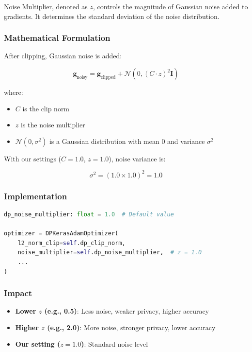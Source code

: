 \documentclass[12pt,a4paper]{article}
\begin{document}
Noise Multiplier, denoted as $z$, controls the magnitude of Gaussian noise added to gradients. It determines the standard deviation of the noise distribution.

\subsubsection{Mathematical Formulation}

After clipping, Gaussian noise is added:

\begin{equation}
\mathbf{g}_{\text{noisy}} = \mathbf{g}_{\text{clipped}} + \mathcal{N}(0, (C \cdot z)^2 \mathbf{I})
\end{equation}

where:
\begin{itemize}
    \item $C$ is the clip norm
    \item $z$ is the noise multiplier
    \item $\mathcal{N}(0, \sigma^2)$ is a Gaussian distribution with mean 0 and variance $\sigma^2$
\end{itemize}

With our settings ($C = 1.0$, $z = 1.0$), noise variance is:

\begin{equation}
\sigma^2 = (1.0 \times 1.0)^2 = 1.0
\end{equation}

\subsubsection{Implementation}

\begin{lstlisting}[language=Python, basicstyle=\small]
dp_noise_multiplier: float = 1.0  # Default value

optimizer = DPKerasAdamOptimizer(
    l2_norm_clip=self.dp_clip_norm,
    noise_multiplier=self.dp_noise_multiplier,  # z = 1.0
    ...
)
\end{lstlisting}

\subsubsection{Impact}

\begin{itemize}
    \item \textbf{Lower $z$ (e.g., 0.5)}: Less noise, weaker privacy, higher accuracy
    \item \textbf{Higher $z$ (e.g., 2.0)}: More noise, stronger privacy, lower accuracy
    \item \textbf{Our setting ($z = 1.0$)}: Standard noise level
\end{itemize}
\end{document}
